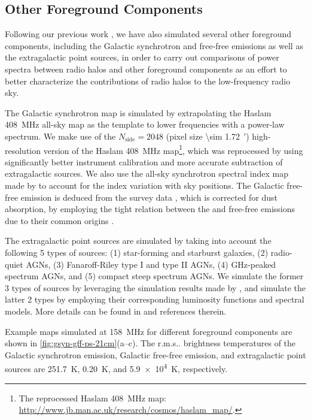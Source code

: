 \documentclass[modern]{aastex62}
\makeatletter
\newcommand{\R}[1]{\mathrm{#1}}
\newcommand{\Halpha}{\text{H$\alpha$}}
\newcommand{\rms}{r.m.s\@ifnextchar.{}{.\@}}
\makeatother
\begin{document}
\subsection{Other Foreground Components}
\label{sec:fg-other}

Following our previous work \citep{wang2010}, we have also simulated
several other foreground components, including the Galactic synchrotron
and free-free emissions as well as the extragalactic point sources,
in order to carry out comparisons of power spectra between radio halos
and other foreground components as an effort to better characterize the
contributions of radio halos to the low-frequency radio sky.

The Galactic synchrotron map is simulated by extrapolating the
Haslam \SI{408}{\MHz} all-sky map as the template to lower frequencies
with a power-law spectrum.
We make use of the $N_{\R{side}} = 2048$
(pixel size \SI{\sim 1.72}{\arcminute})
high-resolution version of the Haslam \SI{408}{\MHz} map\footnote{%
  The reprocessed Haslam \SI{408}{\MHz} map:
  \url{http://www.jb.man.ac.uk/research/cosmos/haslam_map/}.},
which was reprocessed by \citet{remazeilles2015} using significantly
better instrument calibration and more accurate subtraction of
extragalactic sources.
We also use the all-sky synchrotron spectral index map made by
\citet{giardino2002} to account for the index variation with sky positions.
The Galactic free-free emission is deduced from the \Halpha{} survey
data \citep{finkbeiner2003}, which is corrected for dust absorption,
by employing the tight relation between the \Halpha{} and free-free
emissions due to their common origins \citep{dickinson2003}.

The extragalactic point sources are simulated by taking into account the
following 5 types of sources: (1) star-forming and starburst galaxies,
(2) radio-quiet AGNs, (3) Fanaroff-Riley type I and type II AGNs,
(4) GHz-peaked spectrum AGNs, and (5) compact steep spectrum AGNs.
We simulate the former 3 types of sources by leveraging the simulation
results made by \citet{wilman2008}, and simulate the latter 2 types
by employing their corresponding luminosity functions and spectral models.
More details can be found in \citet{wang2010} and references therein.

Example maps simulated at \SI{158}{\MHz} for different foreground
components are shown in \autoref{fig:gsyn-gff-ps-21cm}(a--c).
The \rms{} brightness temperatures of the Galactic synchrotron emission,
Galactic free-free emission, and extragalactic point sources are
\SI{251.7}{\kelvin}, \SI{0.20}{\kelvin}, and \SI{5.9e4}{\kelvin},
respectively.
\end{document}
